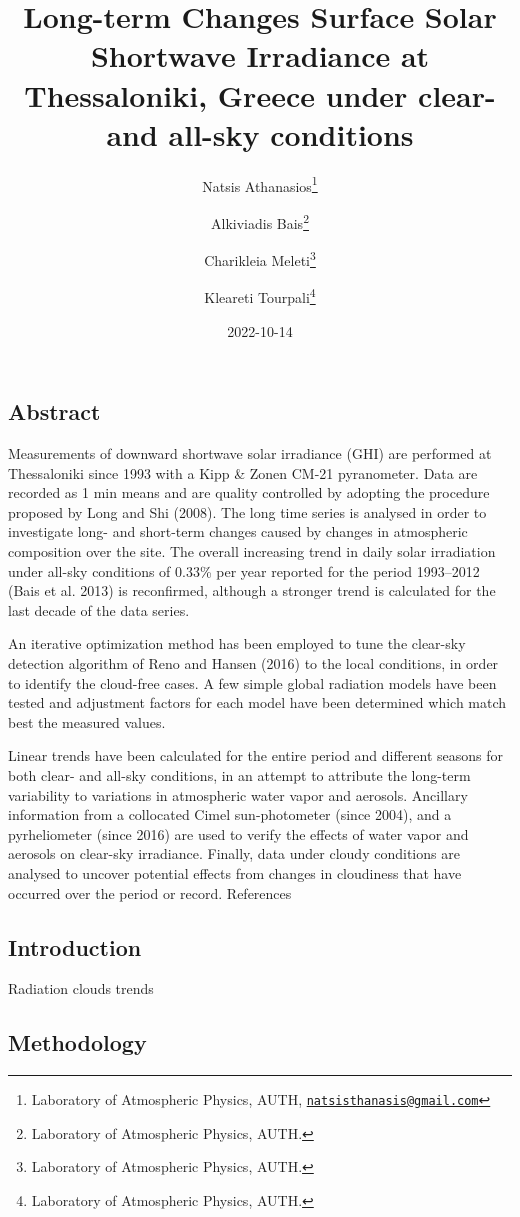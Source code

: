 \documentclass[
  11pt,
  a4paper,oneside]{article}
\title{Long-term Changes Surface Solar Shortwave Irradiance at Thessaloniki, Greece under clear- and all-sky conditions}
\author{Natsis Athanasios\footnote{Laboratory of Atmospheric Physics, AUTH, \href{mailto:natsisthanasis@gmail.com}{\nolinkurl{natsisthanasis@gmail.com}}} \and Alkiviadis Bais\footnote{Laboratory of Atmospheric Physics, AUTH.} \and Charikleia Meleti\footnote{Laboratory of Atmospheric Physics, AUTH.} \and Kleareti Tourpali\footnote{Laboratory of Atmospheric Physics, AUTH.}}
\date{2022-10-14}
\begin{document}
\maketitle

\hypertarget{abstract}{%
\subsection{Abstract}\label{abstract}}

Measurements of downward shortwave solar irradiance (GHI) are performed at Thessaloniki since 1993 with a Kipp \& Zonen CM-21 pyranometer. Data are recorded as 1 min means and are quality controlled by adopting the procedure proposed by Long and Shi (2008). The long time series is analysed in order to investigate long- and short-term changes caused by changes in atmospheric composition over the site. The overall increasing trend in daily solar irradiation under all-sky conditions of 0.33\% per year reported for the period 1993--2012 (Bais et al. 2013) is reconfirmed, although a stronger trend is calculated for the last decade of the data series.

An iterative optimization method has been employed to tune the clear-sky detection algorithm of Reno and Hansen (2016) to the local conditions, in order to identify the cloud-free cases. A few simple global radiation models have been tested and adjustment factors for each model have been determined which match best the measured values.

Linear trends have been calculated for the entire period and different seasons for both clear- and all-sky conditions, in an attempt to attribute the long-term variability to variations in atmospheric water vapor and aerosols. Ancillary information from a collocated Cimel sun-photometer (since 2004), and a pyrheliometer (since 2016) are used to verify the effects of water vapor and aerosols on clear-sky irradiance. Finally, data under cloudy conditions are analysed to uncover potential effects from changes in cloudiness that have occurred over the period or record. References

\hypertarget{introduction}{%
\subsection{Introduction}\label{introduction}}

Radiation clouds trends

\hypertarget{methodology}{%
\subsection{Methodology}\label{methodology}}
\end{document}
